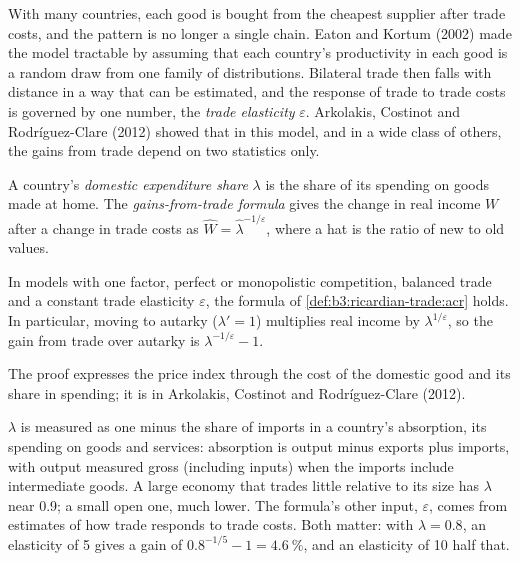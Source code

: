With many countries, each good is bought from the cheapest supplier after trade
costs, and the pattern is no longer a single chain. Eaton and Kortum (2002)
made the model tractable by assuming that each country's productivity in each
good is a random draw from one family of distributions. Bilateral trade then
falls with distance in a way that can be estimated, and the response of trade to
trade costs is governed by one number, the \emph{trade elasticity} $\varepsilon$.
Arkolakis, Costinot and Rodríguez-Clare (2012) showed that in this model, and in a
wide class of others, the gains from trade depend on two statistics only.

\begin{definition}\label{def:b3:ricardian-trade:acr}
A country's \emph{domestic expenditure share} $\lambda$ is the share of its
spending on goods made at home. The \emph{gains-from-trade formula} gives the
change in real income $W$ after a change in trade costs as $\widehat W =
\hat\lambda^{-1/\varepsilon}$, where a hat is the ratio of new to old values.
\end{definition}

\begin{proposition}\label{prop:b3:ricardian-trade:acr}
In models with one factor, perfect or monopolistic competition, balanced trade
and a constant trade elasticity $\varepsilon$, the formula of
\cref{def:b3:ricardian-trade:acr} holds. In particular, moving to autarky
($\lambda' = 1$) multiplies real income by $\lambda^{1/\varepsilon}$, so the gain from
trade over autarky is $\lambda^{-1/\varepsilon} - 1$.
\end{proposition}

\admitted
The proof expresses the price index through the cost of the domestic good and
its share in spending; it is in Arkolakis, Costinot and Rodríguez-Clare (2012).

\begin{measure}
$\lambda$ is measured as one minus the share of imports in a country's absorption,
its spending on goods and services: absorption is output minus exports plus
imports, with output measured gross (including inputs) when the imports include
intermediate goods. A large economy that trades little relative to its size has
$\lambda$ near 0.9; a small open one, much lower. The formula's other input, $\varepsilon$,
comes from estimates of how trade responds to trade costs. Both matter: with
$\lambda = 0.8$, an elasticity of 5 gives a gain of $0.8^{-1/5} - 1 = 4.6~\%$, and an
elasticity of 10 half that.
\end{measure}


